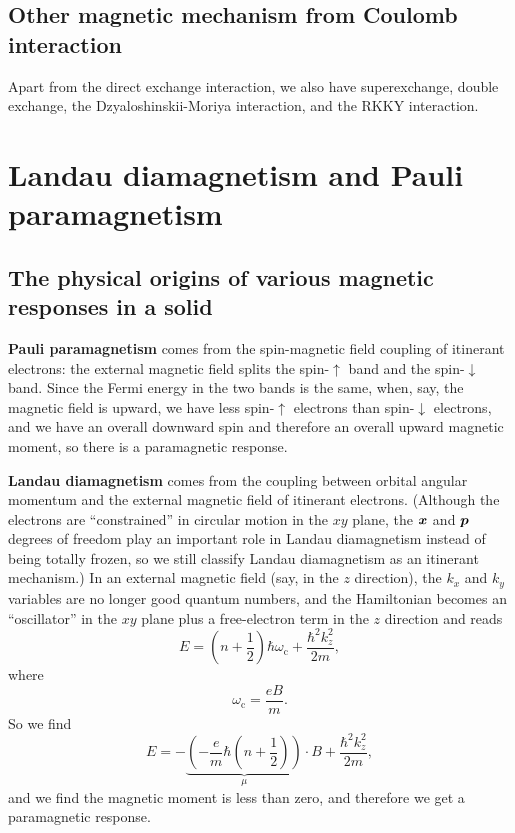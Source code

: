 \documentclass[hyperref, a4paper]{article}
\newcommand*{\concept}[1]{{\textbf{#1}}}
\begin{document}
\subsection{Other magnetic mechanism from Coulomb interaction}

Apart from the direct exchange interaction, 
we also have superexchange, double exchange, 
the Dzyaloshinskii-Moriya interaction,
and the RKKY interaction.

\section{Landau diamagnetism and Pauli paramagnetism}

\subsection{The  physical  origins  of  various  magnetic  responses  in  a  solid}

\concept{Pauli paramagnetism} comes from the spin-magnetic field coupling
of itinerant electrons: 
the external magnetic field splits 
the spin-$\uparrow$ band and the spin-$\downarrow$ band.
Since the Fermi energy in the two bands is the same, 
when, say, the magnetic field is upward, 
we have less spin-$\uparrow$ electrons than spin-$\downarrow$ electrons, 
and we have an overall downward spin 
and therefore an overall upward magnetic moment, 
so there is a paramagnetic response. 

\concept{Landau diamagnetism} comes from the coupling between orbital angular momentum
and the external magnetic field of itinerant electrons. 
(Although the electrons are ``constrained'' in circular motion in the $xy$ plane, 
the $\vb*{x}$ and $\vb*{p}$ degrees of freedom 
play an important role in Landau diamagnetism
instead of being totally frozen, 
so we still classify Landau diamagnetism 
as an itinerant mechanism.)
In an external magnetic field (say, in the $z$ direction),
the $k_x$ and $k_y$ variables are no longer good quantum numbers, 
and the Hamiltonian becomes 
an ``oscillator'' in the $xy$ plane 
plus a free-electron term in the $z$ direction
and reads
\begin{equation}
    E = \left(n + \frac{1}{2}\right) \hbar \omega_{\text{c}} + \frac{\hbar^2 k_z^2}{2m}, 
\end{equation}
where 
\begin{equation}
    \omega_{\text{c}} = \frac{e B}{m}.
\end{equation}
So we find 
\[
    E = - \underbrace{\left(- \frac{e}{m} \hbar \left( n + \frac{1}{2} \right)\right)}_{\mu} \cdot {B} 
    + \frac{\hbar^2 k_z^2}{2m},
\] 
and we find the magnetic moment is less than zero, 
and therefore we get a paramagnetic response.
\end{document}
